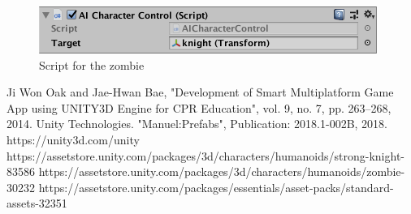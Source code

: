\documentclass[12pt, a4paper, titlepage]{article}
\begin{document}
\begin{figure}[htbp]
  \centering
  \includegraphics[width=.4\textwidth]{pictures/zombie_script}
  \caption{Script for the zombie}
  \label{fig:adding_animations_zombie_script}
\end{figure}


\begin{thebibliography}{00}
 Ji Won Oak and Jae-Hwan Bae, "Development of Smart Multiplatform Game App using UNITY3D Engine for CPR Education", vol. 9, no. 7, pp. 263--268, 2014.
 Unity Technologies. "Manuel:Prefabs", Publication: 2018.1-002B, 2018.
 https://unity3d.com/unity
 https://assetstore.unity.com/packages/3d/characters/humanoids/strong-knight-83586
 https://assetstore.unity.com/packages/3d/characters/humanoids/zombie-30232 
 https://assetstore.unity.com/packages/essentials/asset-packs/standard-assets-32351
\end{thebibliography}
\end{document}
